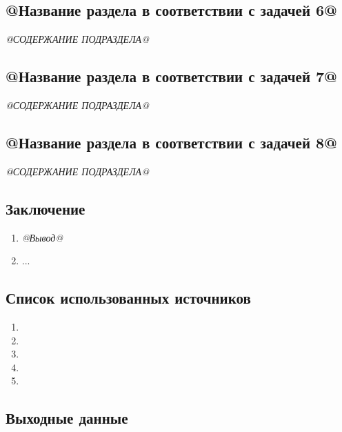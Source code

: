 \subsection{@Название раздела в соответствии с задачей 6@}

\textit{@СОДЕРЖАНИЕ ПОДРАЗДЕЛА@}

\subsection{@Название раздела в соответствии с задачей 7@}

\textit{@СОДЕРЖАНИЕ ПОДРАЗДЕЛА@}

\subsection{@Название раздела в соответствии с задачей 8@}

\textit{@СОДЕРЖАНИЕ ПОДРАЗДЕЛА@}


\subsection*{Заключение}

\begin{enumerate}
	\item \textit{@Вывод@}
	\item ...
\end{enumerate}

\subsection*{Список использованных источников}

\begin{enumerate}
	\item {}
	\item {}
	\item {}
	\item {}
	\item {}
\end{enumerate}

\subsection*{Выходные данные}

\textit{\DocOutReference}

